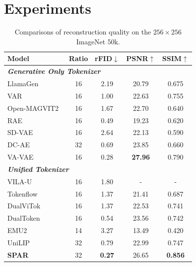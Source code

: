 \documentclass[runningheads]{llncs}
\begin{document}
\section{Experiments}

\begin{table}[t]
\small
\centering
\caption{Comparisons of reconstruction quality on the $256 \times 256$
ImageNet 50k.}
\vspace{-10pt}
\begin{tabular}{lcccc}
\toprule
\textbf{Model} & \textbf{Ratio} & \textbf{rFID}$\downarrow$ & \textbf{PSNR}$\uparrow$ & \textbf{SSIM}$\uparrow$ \\ \midrule
\multicolumn{5}{l}{\textit{\textbf{Generative Only Tokenizer}}} \\
LlamaGen~\cite{sun2024autoregressive}      & 16 & 2.19 & 20.79 & 0.675 \\
VAR~\cite{VAR}         & 16 & 1.00 & 22.63 & 0.755 \\
Open-MAGVIT2~\cite{luo2025openmagvit2opensourceprojectdemocratizing} & 16 & 1.67 & 22.70 & 0.640 \\
RAE~\cite{rae} & 16 & 0.49 & 19.23 & 0.620 \\
SD-VAE~\cite{rombach2022high}  & 16 & 2.64 & 22.13 & 0.590 \\
DC-AE~\cite{chen2024deep} & 32 &0.69 &23.85 &0.660 \\
VA-VAE~\cite{va-vae} & 16  &0.28&\textbf{27.96} &0.790 \\
\midrule
\multicolumn{5}{l}{\textit{\textbf{Unified Tokenizer}}} \\
VILA-U~\cite{wu2024vila} & 16 & 1.80 & - & - \\
Tokenflow~\cite{qu2025tokenflow} & 16 & 1.37 & 21.41 & 0.687 \\
DualViTok~\cite{huang2025illume+} & 16 & 1.37 & 22.53 & 0.741 \\
DualToken~\cite{song2025dualtoken} &  16 &0.54 &23.56 &0.742 \\
EMU2~\cite{sun2024generative} &   14 & 3.27 & 13.49 & 0.420 \\
UniLIP~\cite{tang2025unilip} & 32 & 0.79 & 22.99 & 0.747 \\
\rowcolor[HTML]{EFEFEF}
\textbf{SPAR} & 32 & \textbf{0.27} & {26.65} & \textbf{0.856} \\
\bottomrule
\end{tabular}
\label{tab:rec}
\end{table}
\end{document}
